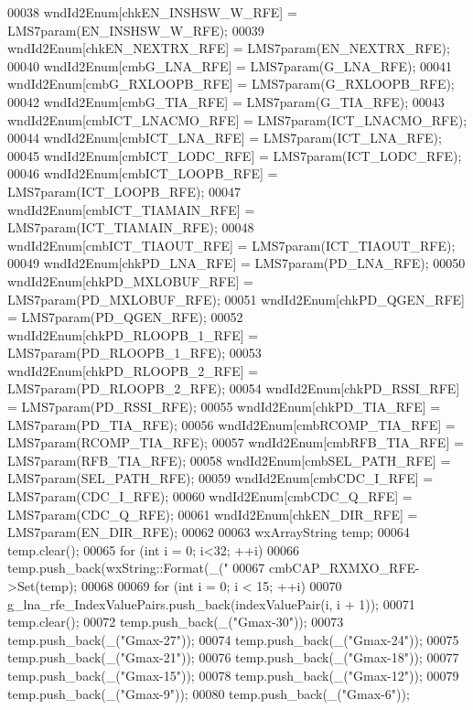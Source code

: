 \begin{DoxyCode}
00038     wndId2Enum[chkEN_INSHSW_W_RFE] = LMS7param(EN_INSHSW_W_RFE);
00039     wndId2Enum[chkEN_NEXTRX_RFE] = LMS7param(EN_NEXTRX_RFE);
00040     wndId2Enum[cmbG_LNA_RFE] = LMS7param(G_LNA_RFE);
00041     wndId2Enum[cmbG_RXLOOPB_RFE] = LMS7param(G_RXLOOPB_RFE);
00042     wndId2Enum[cmbG_TIA_RFE] = LMS7param(G_TIA_RFE);
00043     wndId2Enum[cmbICT_LNACMO_RFE] = LMS7param(ICT_LNACMO_RFE);
00044     wndId2Enum[cmbICT_LNA_RFE] = LMS7param(ICT_LNA_RFE);
00045     wndId2Enum[cmbICT_LODC_RFE] = LMS7param(ICT_LODC_RFE);
00046     wndId2Enum[cmbICT_LOOPB_RFE] = LMS7param(ICT_LOOPB_RFE);
00047     wndId2Enum[cmbICT_TIAMAIN_RFE] = LMS7param(ICT_TIAMAIN_RFE);
00048     wndId2Enum[cmbICT_TIAOUT_RFE] = LMS7param(ICT_TIAOUT_RFE);
00049     wndId2Enum[chkPD_LNA_RFE] = LMS7param(PD_LNA_RFE);
00050     wndId2Enum[chkPD_MXLOBUF_RFE] = LMS7param(PD_MXLOBUF_RFE);
00051     wndId2Enum[chkPD_QGEN_RFE] = LMS7param(PD_QGEN_RFE);
00052     wndId2Enum[chkPD_RLOOPB_1_RFE] = LMS7param(PD_RLOOPB_1_RFE);
00053     wndId2Enum[chkPD_RLOOPB_2_RFE] = LMS7param(PD_RLOOPB_2_RFE);
00054     wndId2Enum[chkPD_RSSI_RFE] = LMS7param(PD_RSSI_RFE);
00055     wndId2Enum[chkPD_TIA_RFE] = LMS7param(PD_TIA_RFE);
00056     wndId2Enum[cmbRCOMP_TIA_RFE] = LMS7param(RCOMP_TIA_RFE);
00057     wndId2Enum[cmbRFB_TIA_RFE] = LMS7param(RFB_TIA_RFE);
00058     wndId2Enum[cmbSEL_PATH_RFE] = LMS7param(SEL_PATH_RFE);
00059     wndId2Enum[cmbCDC_I_RFE] = LMS7param(CDC_I_RFE);
00060     wndId2Enum[cmbCDC_Q_RFE] = LMS7param(CDC_Q_RFE);
00061     wndId2Enum[chkEN_DIR_RFE] = LMS7param(EN_DIR_RFE);
00062 
00063     wxArrayString temp;
00064     temp.clear();
00065     \textcolor{keywordflow}{for} (\textcolor{keywordtype}{int} i = 0; i<32; ++i)
00066         temp.push\_back(wxString::Format(\_(\textcolor{stringliteral}{"%
00067     cmbCAP_RXMXO_RFE->Set(temp);
00068 
00069     \textcolor{keywordflow}{for} (\textcolor{keywordtype}{int} i = 0; i < 15; ++i)
00070         g_lna_rfe_IndexValuePairs.push\_back(indexValuePair(i, i + 1));
00071     temp.clear();
00072     temp.push\_back(\_(\textcolor{stringliteral}{"Gmax-30"}));
00073     temp.push\_back(\_(\textcolor{stringliteral}{"Gmax-27"}));
00074     temp.push\_back(\_(\textcolor{stringliteral}{"Gmax-24"}));
00075     temp.push\_back(\_(\textcolor{stringliteral}{"Gmax-21"}));
00076     temp.push\_back(\_(\textcolor{stringliteral}{"Gmax-18"}));
00077     temp.push\_back(\_(\textcolor{stringliteral}{"Gmax-15"}));
00078     temp.push\_back(\_(\textcolor{stringliteral}{"Gmax-12"}));
00079     temp.push\_back(\_(\textcolor{stringliteral}{"Gmax-9"}));
00080     temp.push\_back(\_(\textcolor{stringliteral}{"Gmax-6"}));
}
\end{DoxyCode}
